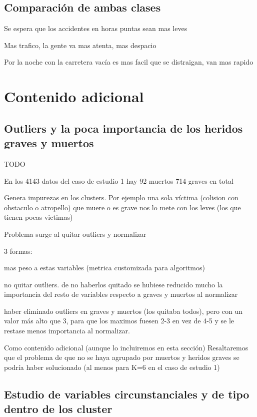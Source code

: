 \documentclass[oneside]{book}
\begin{document}
\subsection{Comparación de ambas clases}

Se espera que los accidentes en horas puntas sean mas leves

Mas trafico, la gente va mas atenta, mas despacio

Por la noche con la carretera vacía es mas facil que se distraigan,
van mas rapido

\section{Contenido adicional}

\subsection{Outliers y la poca importancia de los heridos graves y
  muertos} \label{sec:outliers}

TODO

En los 4143 datos del caso de estudio 1 hay 92 muertos
714 graves en total

Genera impurezas en los clusters. Por ejemplo una sola víctima
(colision con obstaculo o atropello) que muere o es grave nos lo mete con los leves (los que tienen pocas victimas)

Problema surge al quitar outliers
y normalizar

3 formas:

mas peso a estas variables (metrica customizada para
algoritmos)

no quitar outliers. de no haberlos quitado se hubiese
reducido mucho la importancia del resto de variables respecto a graves y muertos al normalizar

haber eliminado outliers en graves y muertos (los quitaba todos), pero
con un valor más alto que 3, para que los maximos fuesen 2-3 en vez de
4-5 y se le restase menos importancia al normalizar.

Como contenido adicional (aunque lo incluiremos en esta sección)
Resaltaremos que el problema de que no se haya agrupado por muertos y
heridos graves se podría haber solucionado (al menos para K=6 en el
caso de estudio 1)

\subsection{Estudio de variables circunstanciales y de tipo dentro de
  los cluster}
\end{document}
